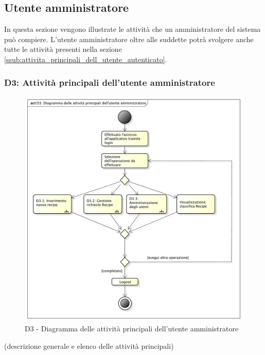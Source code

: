
	\pagebreak



	\subsection{Utente amministratore} %
	\label{sub:utente_amministratore}
	In questa sezione vengono illustrate le attività che un amministratore del sistema può compiere. L'utente amministratore oltre alle suddette potrà svolgere anche tutte le attività presenti nella sezione \ref{ssub:attivita_principali_dell_utente_autenticato}.
		\subsubsection{D3: Attività principali dell'utente amministratore} %
		\label{ssub:attivita_principali_dell_utente_amministratore}
		\begin{figure}[!htbp]
			\centering
			\centerline{\includegraphics[scale=0.45]{./images/D3.pdf}}
			\caption{D3 - Diagramma delle attività principali dell'utente amministratore}
		\end{figure}
		\noindent
		[TO DO] (descrizione generale e elenco delle attività principali)

